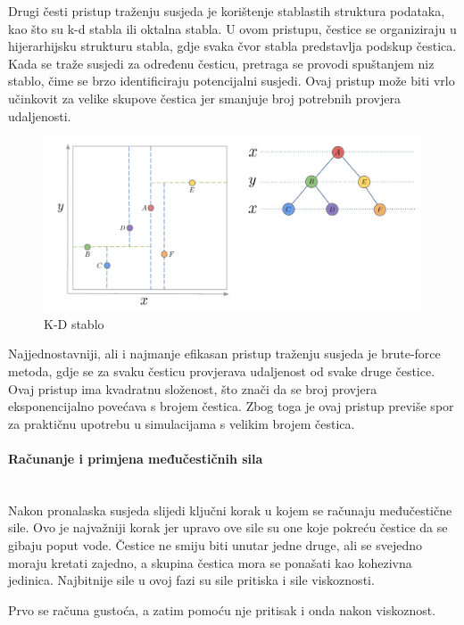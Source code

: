 \documentclass[diplomskirad]{fer}
\newcommand{\paragraphnewline}[1]{\paragraph{#1}\mbox{}\\}
\begin{document}
    Drugi česti pristup traženju susjeda je korištenje stablastih struktura podataka, kao što su k-d stabla ili oktalna stabla.
    U ovom pristupu, čestice se organiziraju u hijerarhijsku strukturu stabla, gdje svaka čvor stabla predstavlja podskup čestica.
    Kada se traže susjedi za određenu česticu, pretraga se provodi spuštanjem niz stablo, čime se brzo identificiraju potencijalni susjedi.
    Ovaj pristup može biti vrlo učinkovit za velike skupove čestica jer smanjuje broj potrebnih provjera udaljenosti.

    \begin{figure}[H]
        \centering
        \includegraphics[scale=0.3]{images/kdtree}
        \caption{
            K-D stablo \cite{kdTree}
        }
        \label{fig:kdTree}
    \end{figure}

    Najjednostavniji, ali i najmanje efikasan pristup traženju susjeda je brute-force metoda, gdje se za svaku česticu provjerava udaljenost od svake druge čestice.
    Ovaj pristup ima kvadratnu složenost, što znači da se broj provjera eksponencijalno povećava s brojem čestica.
    Zbog toga je ovaj pristup previše spor za praktičnu upotrebu u simulacijama s velikim brojem čestica.


    \paragraphnewline{Računanje i primjena međučestičnih sila}

    Nakon pronalaska susjeda slijedi ključni korak u kojem se računaju međučestične sile.
    Ovo je najvažniji korak jer upravo ove sile su one koje pokreću čestice da se gibaju poput vode.
    Čestice ne smiju biti unutar jedne druge, ali se svejedno moraju kretati zajedno, a skupina čestica mora se ponašati kao kohezivna jedinica.
    Najbitnije sile u ovoj fazi su sile pritiska i sile viskoznosti.

    Prvo se računa gustoća, a zatim pomoću nje pritisak i onda nakon viskoznost.
\end{document}
